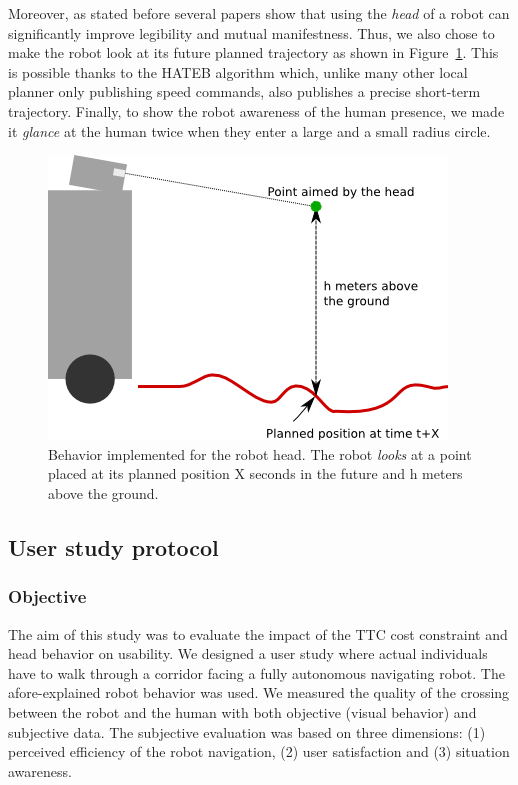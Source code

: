 \documentclass[a4paper,11pt,twoside]{StyleThese}
\begin{document}
Moreover, as stated before several papers show that using the \textit{head} of a robot can significantly improve legibility and mutual manifestness. Thus, we also chose to make the robot look at its future planned trajectory as shown in Figure~\ref{fig:head_gaze_behavior}. This is possible thanks to the HATEB algorithm which, unlike many other local planner only publishing  speed commands, also publishes a precise short-term trajectory. Finally, to show the robot awareness of the human presence, we made it \textit{glance} at the human twice when they enter a large and a small radius circle.

\begin{figure}[hbtp]
\centering
\includegraphics[scale=0.6]{figures/chapter2/head_traj_follower.png}
\caption{Behavior implemented for the robot head. The robot \textit{looks} at a point placed at its planned position X seconds in the future and h meters above the ground.}
\label{fig:head_gaze_behavior}
\end{figure}

\subsection{User study protocol}

\subsubsection{Objective}
The aim of this study was to evaluate the impact of the TTC cost constraint and head behavior on usability. We designed a user study where actual individuals have to walk through a corridor facing a fully autonomous navigating robot. The afore-explained robot behavior was used. We measured the quality of the crossing between the robot and the human with both objective (visual behavior) and subjective data. The subjective evaluation was based on three dimensions: (1) perceived efficiency of the robot navigation, (2) user satisfaction and (3) situation awareness.
\end{document}
